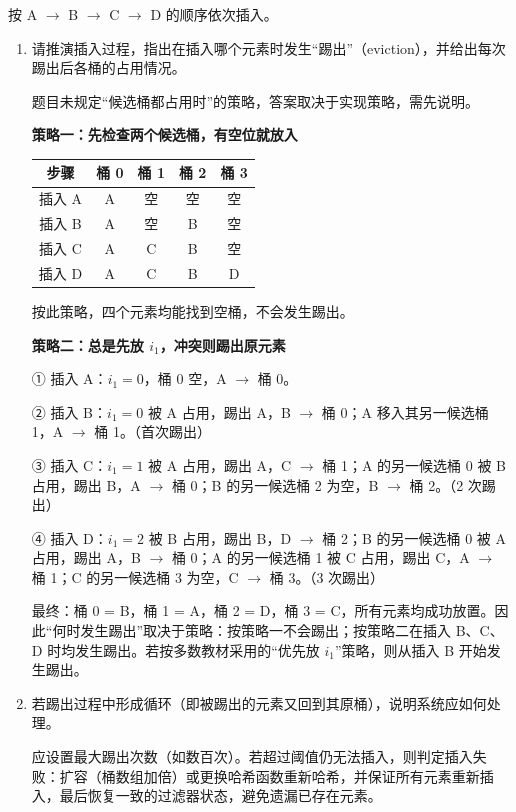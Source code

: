 \documentclass[UTF8,a4paper,11pt]{ctexart}
\newenvironment{answer}%
  {\begin{ans}\noindent{\bfseries\color{ansframe}【答案】}\hspace{0.4em}}%
  {\end{ans}}
\begin{document}
\begin{enumerate}
按 A $\rightarrow$ B $\rightarrow$ C $\rightarrow$ D 的顺序依次插入。

\begin{enumerate}
\item 请推演插入过程，指出在插入哪个元素时发生“踢出”（eviction），并给出每次踢出后各桶的占用情况。
\begin{answer}
题目未规定“候选桶都占用时”的策略，答案取决于实现策略，需先说明。\par
\textbf{策略一：先检查两个候选桶，有空位就放入}

\begin{center}
\begin{tabular}{@{}ccccc@{}}
\toprule
步骤 & 桶 0 & 桶 1 & 桶 2 & 桶 3 \\
\midrule
插入 A & A & 空 & 空 & 空 \\
插入 B & A & 空 & B & 空 \\
插入 C & A & C & B & 空 \\
插入 D & A & C & B & D \\
\bottomrule
\end{tabular}
\end{center}

按此策略，四个元素均能找到空桶，不会发生踢出。\par
\textbf{策略二：总是先放 $i_1$，冲突则踢出原元素}\par
① 插入 A：$i_1=0$，桶 0 空，A $\rightarrow$ 桶 0。\par
② 插入 B：$i_1=0$ 被 A 占用，踢出 A，B $\rightarrow$ 桶 0；A 移入其另一候选桶 1，A $\rightarrow$ 桶 1。（首次踢出）\par
③ 插入 C：$i_1=1$ 被 A 占用，踢出 A，C $\rightarrow$ 桶 1；A 的另一候选桶 0 被 B 占用，踢出 B，A $\rightarrow$ 桶 0；B 的另一候选桶 2 为空，B $\rightarrow$ 桶 2。（2 次踢出）\par
④ 插入 D：$i_1=2$ 被 B 占用，踢出 B，D $\rightarrow$ 桶 2；B 的另一候选桶 0 被 A 占用，踢出 A，B $\rightarrow$ 桶 0；A 的另一候选桶 1 被 C 占用，踢出 C，A $\rightarrow$ 桶 1；C 的另一候选桶 3 为空，C $\rightarrow$ 桶 3。（3 次踢出）\par
最终：桶 0 = B，桶 1 = A，桶 2 = D，桶 3 = C，所有元素均成功放置。因此“何时发生踢出”取决于策略：按策略一不会踢出；按策略二在插入 B、C、D 时均发生踢出。若按多数教材采用的“优先放 $i_1$”策略，则从插入 B 开始发生踢出。
\end{answer}

\item 若踢出过程中形成循环（即被踢出的元素又回到其原桶），说明系统应如何处理。
\begin{answer}
应设置最大踢出次数（如数百次）。若超过阈值仍无法插入，则判定插入失败：扩容（桶数组加倍）或更换哈希函数重新哈希，并保证所有元素重新插入，最后恢复一致的过滤器状态，避免遗漏已存在元素。
\end{answer}


\end{enumerate}
\end{enumerate}
\end{document}

